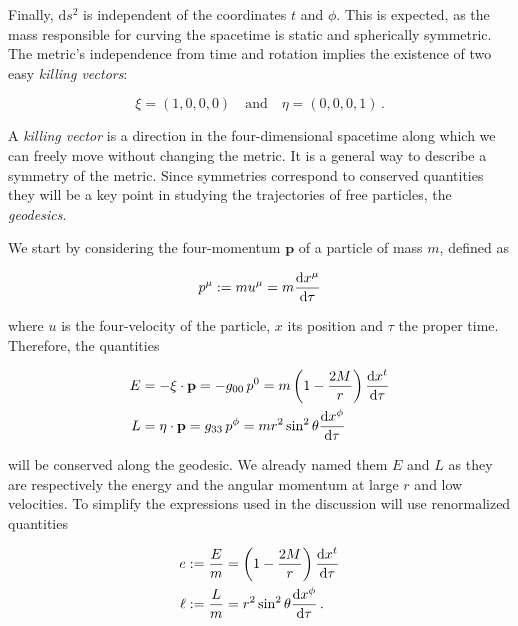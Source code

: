 Finally, $\mathrm{d}s^2$ is independent of the coordinates $t$ and $\phi$.
This is expected, as the mass responsible for curving the spacetime is static
and spherically symmetric.
The metric’s independence from time and rotation implies the existence of two
easy \textit{killing vectors}:

\begin{equation}
    \xi = (1, 0, 0, 0) \quad \text{and} \quad \eta = (0, 0, 0, 1) \, .
    \label{cap1:eq:xi_eta}
\end{equation}

A \textit{killing vector} is a direction in the four-dimensional spacetime
along which we can freely move without changing the metric.
It is a general way to describe a symmetry of the metric.
Since symmetries correspond to conserved quantities they will be a key point in
studying the trajectories of free particles, the \textit{geodesics}.

We start by considering the four-momentum $\mathbf{p}$ of a particle of mass
$m$, defined as

\begin{equation}
    p^\mu := m u^\mu = m \dv{x^\mu}{\tau}
\end{equation}

where $u$ is the four-velocity of the particle, $x$ its position and $\tau$ the
proper time.
Therefore, the quantities

\begin{align*}
    E &= - \mathbf{\xi \cdot p} =
    - g_{00} \, p^0 = m \left( 1 - \frac{2M}{r} \right) \dv{x^t}{\tau} \\
    L &= \mathbf{\eta \cdot p} =
    g_{33} \, p^\phi = m r^2 \sin^2 \theta \dv{x^\phi}{\tau}
\end{align*}

will be conserved along the geodesic.
We already named them $E$ and $L$ as they are respectively the energy and the
angular momentum at large $r$ and low velocities.
To simplify the expressions used in the discussion will use renormalized
quantities

\begin{subequations}
    \begin{align}
        e &:= \frac{E}{m} = \left( 1 - \frac{2M}{r} \right) \dv{x^t}{\tau}
        \label{cap1:eq:conserved_e} \\
        \ell &:= \frac{L}{m} = r^2 \sin^2 \theta \dv{x^\phi}{\tau} \, .
        \label{cap1:eq:conserved_l}
    \end{align}
\end{subequations}

